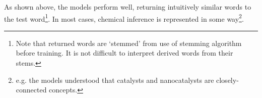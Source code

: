 As shown above, the models perform well, returning intuitively similar words to the test word\footnote{Note that returned words are `stemmed' from use of stemming algorithm before training. It is not difficult to interpret derived words from their stems.}. In most cases, chemical inference is represented in some way\footnote{e.g. the models understood that catalysts and nanocatalysts are closely-connected concepts.}.


